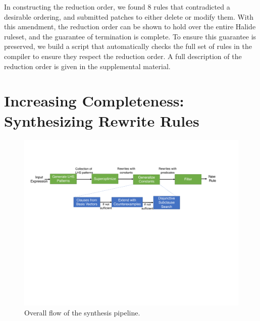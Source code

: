 \documentclass[acmsmall,review,anonymous]{acmart}\settopmatter{printfolios=true,printccs=false,printacmref=false}
\begin{document}
In constructing the reduction order, we found 8 rules that contradicted a desirable ordering, and submitted patches to either delete or modify them. With this amendment, the reduction order can be shown to hold over the entire Halide ruleset, and the guarantee of termination is complete. To ensure this guarantee is preserved, we build a script that automatically checks the full set of rules in the compiler to ensure they respect the reduction order. A full description of the reduction order is given in the supplemental material.

\section{Increasing Completeness: Synthesizing Rewrite Rules}
\begin{figure}
\includegraphics[width=1.\columnwidth]{figures/synthesis-flow.pdf}
\caption{Overall flow of the synthesis pipeline.}
\label{fig:synthesis-flow}
\end{figure}
\end{document}
